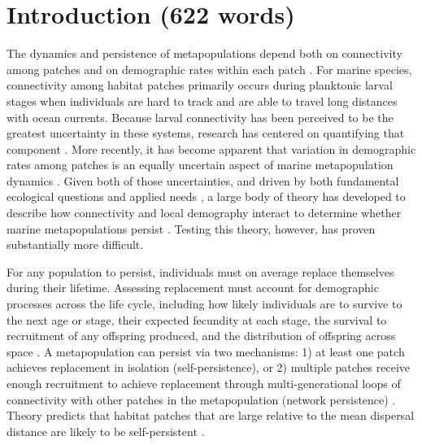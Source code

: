 \documentclass[12pt, oneside]{article}   	%
\begin{document}

\linenumbers{}
\modulolinenumbers[3]

\section*{Introduction (622 words)} 

The dynamics and persistence of metapopulations depend both on connectivity among patches and on demographic rates within each patch \citep{hastings_persistence_2006, hanski1998metapopulation}. For marine species, connectivity among habitat patches primarily occurs during planktonic larval stages when individuals are hard to track and are able to travel long distances with ocean currents. Because larval connectivity has been perceived to be the greatest uncertainty in these systems, research has centered on quantifying that component \citep[reviewed by][]{white2019connectivity}. More recently, it has become apparent that variation in demographic rates among patches is an equally uncertain aspect of marine metapopulation dynamics \citep{hameed2016inverse, white2011oceanographic}. Given both of those uncertainties, and driven by both fundamental ecological questions and applied needs \citep{botsford_dependence_2001,white_population_2010}, a large body of theory has developed to describe how connectivity and local demography interact to determine whether marine metapopulations persist \citep{burgess2014beyond, botsford2019population}. Testing this theory, however, has proven substantially more difficult.

For any population to persist, individuals must on average replace themselves during their lifetime. Assessing replacement must account for demographic processes across the life cycle, including how likely individuals are to survive to the next age or stage, their expected fecundity at each stage, the survival to recruitment of any offspring produced, and the distribution of offspring across space \citep{hastings_persistence_2006}. A metapopulation can persist via two mechanisms: 1) at least one patch achieves replacement in isolation (self-persistence), or 2) multiple patches receive enough recruitment to achieve replacement through multi-generational loops of connectivity with other patches in the metapopulation (network persistence) \citep{hastings_persistence_2006, burgess2014beyond}. Theory predicts that habitat patches that are large relative to the mean dispersal distance are likely to be self-persistent \citep{white_population_2010}. %
\end{document}
